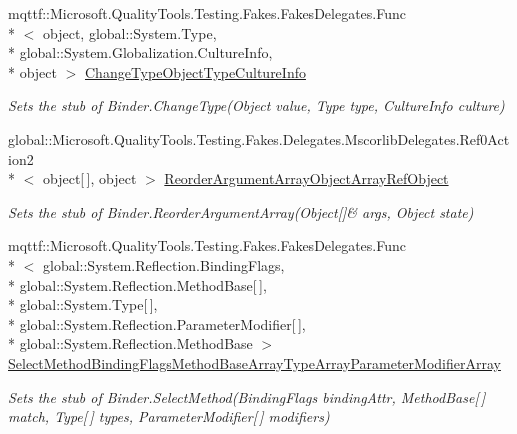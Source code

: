 \begin{DoxyCompactItemize}
mqttf\-::\-Microsoft.\-Quality\-Tools.\-Testing.\-Fakes.\-Fakes\-Delegates.\-Func\\*
$<$ object, global\-::\-System.\-Type, \\*
global\-::\-System.\-Globalization.\-Culture\-Info, \\*
object $>$ \hyperlink{class_system_1_1_reflection_1_1_fakes_1_1_stub_binder_aea13181476a6070e747edcc80089f2a5}{Change\-Type\-Object\-Type\-Culture\-Info}
\begin{DoxyCompactList}\small\item\em Sets the stub of Binder.\-Change\-Type(\-Object value, Type type, Culture\-Info culture)\end{DoxyCompactList}\item 
global\-::\-Microsoft.\-Quality\-Tools.\-Testing.\-Fakes.\-Delegates.\-Mscorlib\-Delegates.\-Ref0\-Action2\\*
$<$ object\mbox{[}$\,$\mbox{]}, object $>$ \hyperlink{class_system_1_1_reflection_1_1_fakes_1_1_stub_binder_a8401d4a02cbbd631a6b8f9ac00b81215}{Reorder\-Argument\-Array\-Object\-Array\-Ref\-Object}
\begin{DoxyCompactList}\small\item\em Sets the stub of Binder.\-Reorder\-Argument\-Array(Object\mbox{[}\mbox{]}\& args, Object state)\end{DoxyCompactList}\item 
mqttf\-::\-Microsoft.\-Quality\-Tools.\-Testing.\-Fakes.\-Fakes\-Delegates.\-Func\\*
$<$ global\-::\-System.\-Reflection.\-Binding\-Flags, \\*
global\-::\-System.\-Reflection.\-Method\-Base\mbox{[}$\,$\mbox{]}, \\*
global\-::\-System.\-Type\mbox{[}$\,$\mbox{]}, \\*
global\-::\-System.\-Reflection.\-Parameter\-Modifier\mbox{[}$\,$\mbox{]}, \\*
global\-::\-System.\-Reflection.\-Method\-Base $>$ \hyperlink{class_system_1_1_reflection_1_1_fakes_1_1_stub_binder_a2059a1067c17f75f69217790578cc8a5}{Select\-Method\-Binding\-Flags\-Method\-Base\-Array\-Type\-Array\-Parameter\-Modifier\-Array}
\begin{DoxyCompactList}\small\item\em Sets the stub of Binder.\-Select\-Method(\-Binding\-Flags binding\-Attr, Method\-Base\mbox{[}$\,$\mbox{]} match, Type\mbox{[}$\,$\mbox{]} types, Parameter\-Modifier\mbox{[}$\,$\mbox{]} modifiers)\end{DoxyCompactList}\item 

\end{DoxyCompactItemize}
